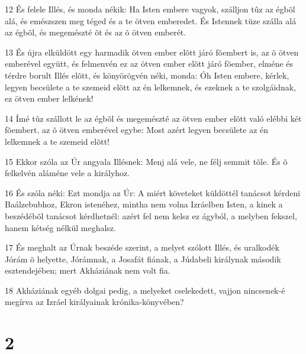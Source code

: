 \par 12 És felele Illés, és monda nékik: Ha Isten embere vagyok, szálljon tûz az égbõl alá, és emészszen meg téged és a te ötven emberedet. És Istennek tüze szálla alá az égbõl, és megemészté õt és az õ ötven emberét.
\par 13 És újra elküldött egy harmadik ötven ember elõtt járó fõembert is, az õ ötven emberével együtt, és felmenvén ez az ötven ember elõtt járó fõember, elméne és térdre borult Illés elõtt, és könyörögvén néki, monda: Óh Isten embere, kérlek, legyen becsülete a te szemeid elõtt az én lelkemnek, és ezeknek a te szolgáidnak, ez ötven ember lelkének!
\par 14 Ímé tûz szállott le az égbõl és megemészté az ötven ember elõtt való elébbi két fõembert, az õ ötven emberével egybe: Most azért legyen becsülete az én lelkemnek a te szemeid elõtt!
\par 15 Ekkor szóla az Úr angyala Illésnek: Menj alá vele, ne félj semmit tõle. És õ felkelvén aláméne vele a királyhoz.
\par 16 És szóla néki: Ezt mondja az Úr: A miért követeket küldöttél tanácsot kérdeni Baálzebubhoz, Ekron istenéhez, mintha nem volna Izráelben Isten, a kinek a beszédébõl tanácsot kérdhetnél: azért fel nem kelsz ez ágyból, a melyben fekszel, hanem kétség nélkül meghalsz.
\par 17 És meghalt az Úrnak beszéde szerint, a melyet szólott Illés, és uralkodék Jórám õ helyette, Jórámnak, a Josafát fiának, a Júdabeli királynak második esztendejében; mert Akháziának nem volt fia.
\par 18 Akháziának egyéb dolgai pedig, a melyeket cselekedett, vajjon nincsenek-é megírva az Izráel királyainak krónika-könyvében?

\chapter{2}

